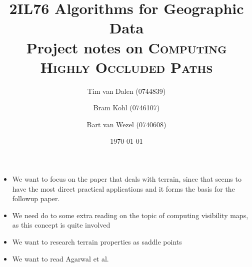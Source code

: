 \documentclass[a4paper,11pt]{article}
\title{
	\Huge{2IL76 Algorithms for Geographic Data}\\
	Project notes on \textsc{Computing Highly Occluded Paths}
}
\author{
	Tim van Dalen (0744839)
	\and
	Bram Kohl (0746107)
	\and
	Bart van Wezel (0740608)
}
\date{\today}
\begin{document}
	\maketitle
	
	\begin{itemize}
		\item We want to focus on the paper that deals with terrain, since that seems to have the most direct practical applications and it forms the basis for the followup paper.
		\item We need do to some extra reading on the topic of computing visibility maps, as this concept is quite involved
		\item We want to research terrain properties as saddle points
		\item We want to read Agarwal et al.
	\end{itemize}
\end{document}
